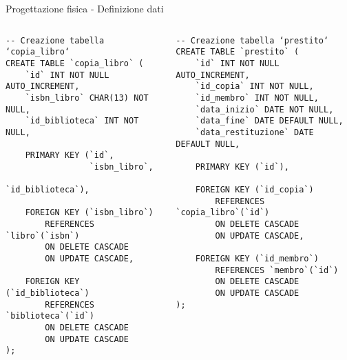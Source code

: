 \begin{frame}[fragile]{Progettazione fisica - Definizione dati}
    \begin{columns}[T]
        \begin{column}[T]{.45\textwidth}
            \begin{verbatim}
-- Creazione tabella ‘copia_libro‘
CREATE TABLE `copia_libro` (
    `id` INT NOT NULL AUTO_INCREMENT,
    `isbn_libro` CHAR(13) NOT NULL,
    `id_biblioteca` INT NOT NULL,

    PRIMARY KEY (`id`,
                 `isbn_libro`,
                 `id_biblioteca`),

    FOREIGN KEY (`isbn_libro`)
        REFERENCES `libro`(`isbn`)
        ON DELETE CASCADE
        ON UPDATE CASCADE,

    FOREIGN KEY (`id_biblioteca`)
        REFERENCES `biblioteca`(`id`)
        ON DELETE CASCADE
        ON UPDATE CASCADE
);
            \end{verbatim}
        \end{column}
        \begin{column}[T]{.45\textwidth}
            \begin{verbatim}
-- Creazione tabella ‘prestito‘
CREATE TABLE `prestito` (
    `id` INT NOT NULL AUTO_INCREMENT,
    `id_copia` INT NOT NULL,
    `id_membro` INT NOT NULL,
    `data_inizio` DATE NOT NULL,
    `data_fine` DATE DEFAULT NULL,
    `data_restituzione` DATE DEFAULT NULL,

    PRIMARY KEY (`id`),

    FOREIGN KEY (`id_copia`)
        REFERENCES `copia_libro`(`id`)
        ON DELETE CASCADE
        ON UPDATE CASCADE,

    FOREIGN KEY (`id_membro`)
        REFERENCES `membro`(`id`)
        ON DELETE CASCADE
        ON UPDATE CASCADE
);
            \end{verbatim}
        \end{column}
    \end{columns}
\end{frame}

